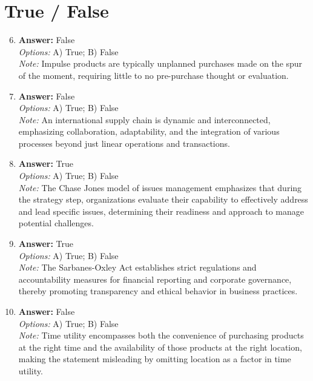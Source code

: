 \documentclass[12pt]{article}
\begin{document}
\section*{True / False}
\begin{enumerate}[label=\arabic*.]
\setcounter{enumi}{5}
\item \textbf{Answer:} False
\\ \textit{Options:} A) True; B) False
\\ \textit{Note:} Impulse products are typically unplanned purchases made on the spur of the moment, requiring little to no pre-purchase thought or evaluation.
\item \textbf{Answer:} False
\\ \textit{Options:} A) True; B) False
\\ \textit{Note:} An international supply chain is dynamic and interconnected, emphasizing collaboration, adaptability, and the integration of various processes beyond just linear operations and transactions.
\item \textbf{Answer:} True
\\ \textit{Options:} A) True; B) False
\\ \textit{Note:} The Chase Jones model of issues management emphasizes that during the strategy step, organizations evaluate their capability to effectively address and lead specific issues, determining their readiness and approach to manage potential challenges.
\item \textbf{Answer:} True
\\ \textit{Options:} A) True; B) False
\\ \textit{Note:} The Sarbanes-Oxley Act establishes strict regulations and accountability measures for financial reporting and corporate governance, thereby promoting transparency and ethical behavior in business practices.
\item \textbf{Answer:} False
\\ \textit{Options:} A) True; B) False
\\ \textit{Note:} Time utility encompasses both the convenience of purchasing products at the right time and the availability of those products at the right location, making the statement misleading by omitting location as a factor in time utility.
\end{enumerate}
\end{document}
